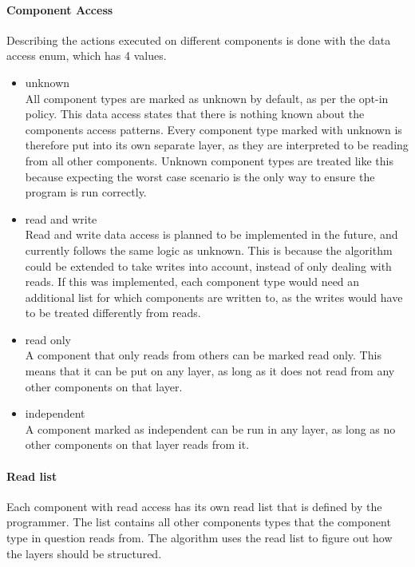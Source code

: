 \paragraph{Component Access}
\label{subsec:detailed_component_access_levels}
Describing the actions executed on different components is done with the data access enum, which has 4 values.

\begin{itemize}
    \item unknown\\
    All component types are marked as unknown by default, as per the opt-in policy.
    This data access states that there is nothing known about the components access patterns.
    Every component type marked with unknown is therefore put into its own separate layer, as they are interpreted to be reading from all other components.
    Unknown component types are treated like this because expecting the worst case scenario is the only way to ensure the program is run correctly.

    \item read and write\\
    Read and write data access is planned to be implemented in the future, and currently follows the same logic as unknown.
    This is because the algorithm could be extended to take writes into account, instead of only dealing with reads.
    If this was implemented, each component type would need an additional list for which components are written to,
    as the writes would have to be treated differently from reads.

    \item read only\\
    A component that only reads from others can be marked read only. This means that it can be put on any layer, as long
    as it does not read from any other components on that layer.

    \item independent\\
    A component marked as independent can be run in any layer, as long as no other components on that layer reads from it.
\end{itemize}

\paragraph{Read list}
\label{subsec:detailed_read_list}
Each component with read access has its own read list that is defined by the programmer.
The list contains all other components types that the component type in question reads from.
The algorithm uses the read list to figure out how the layers should be structured.


